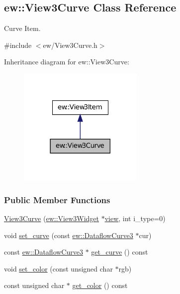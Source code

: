 \hypertarget{classew_1_1View3Curve}{
\subsection{ew::View3Curve Class Reference}
\label{classew_1_1View3Curve}
}


Curve Item.  




{\ttfamily \#include $<$ew/View3Curve.h$>$}



Inheritance diagram for ew::View3Curve:
\nopagebreak
\begin{figure}[H]
\begin{center}
\leavevmode
\includegraphics[width=170pt]{classew_1_1View3Curve__inherit__graph}
\end{center}
\end{figure}
\subsubsection*{Public Member Functions}
\begin{DoxyCompactItemize}
\item 
\hyperlink{classew_1_1View3Curve_a7c1a90f7ca7de52c42bff7f5b0cac0d9}{View3Curve} (\hyperlink{classew_1_1View3Widget}{ew::View3Widget} $\ast$\hyperlink{classew_1_1View3Item_a7d765842ec7b9e145cefa37e3dbae658}{view}, int i\_\-type=0)
\item 
void \hyperlink{classew_1_1View3Curve_a3a7ac177b754f5888d1db92af4d18cdb}{set\_\-curve} (const \hyperlink{classew_1_1DataflowCurve3}{ew::DataflowCurve3} $\ast$cur)
\item 
const \hyperlink{classew_1_1DataflowCurve3}{ew::DataflowCurve3} $\ast$ \hyperlink{classew_1_1View3Curve_a70dcbaad96d985a6ab000b9ee0018c6d}{get\_\-curve} () const 
\item 
void \hyperlink{classew_1_1View3Curve_a8b8e42671e07b55cff891847b93a2fe7}{set\_\-color} (const unsigned char $\ast$rgb)
\item 
const unsigned char $\ast$ \hyperlink{classew_1_1View3Curve_a4286dde821d57c24f54dad948f92a827}{get\_\-color} () const 
\end{DoxyCompactItemize}


